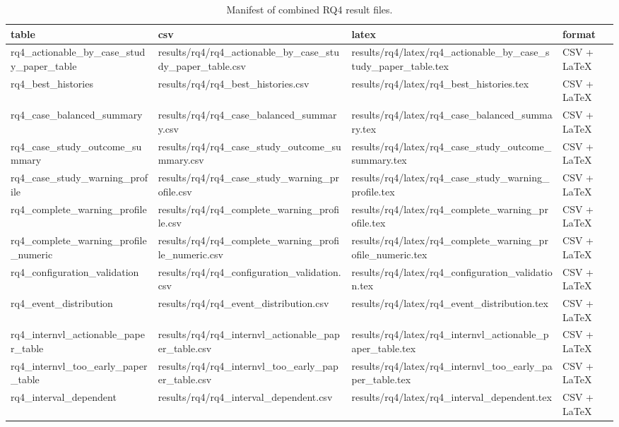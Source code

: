 \begin{table}[tbp]
\caption{Manifest of combined RQ4 result files.}
\label{tab:rq4-output-manifest}
\begin{tabular}{llll}
\toprule
table & csv & latex & format \\
\midrule
rq4\_actionable\_by\_case\_study\_paper\_table & results/rq4/rq4\_actionable\_by\_case\_study\_paper\_table.csv & results/rq4/latex/rq4\_actionable\_by\_case\_study\_paper\_table.tex & CSV + LaTeX \\
rq4\_best\_histories & results/rq4/rq4\_best\_histories.csv & results/rq4/latex/rq4\_best\_histories.tex & CSV + LaTeX \\
rq4\_case\_balanced\_summary & results/rq4/rq4\_case\_balanced\_summary.csv & results/rq4/latex/rq4\_case\_balanced\_summary.tex & CSV + LaTeX \\
rq4\_case\_study\_outcome\_summary & results/rq4/rq4\_case\_study\_outcome\_summary.csv & results/rq4/latex/rq4\_case\_study\_outcome\_summary.tex & CSV + LaTeX \\
rq4\_case\_study\_warning\_profile & results/rq4/rq4\_case\_study\_warning\_profile.csv & results/rq4/latex/rq4\_case\_study\_warning\_profile.tex & CSV + LaTeX \\
rq4\_complete\_warning\_profile & results/rq4/rq4\_complete\_warning\_profile.csv & results/rq4/latex/rq4\_complete\_warning\_profile.tex & CSV + LaTeX \\
rq4\_complete\_warning\_profile\_numeric & results/rq4/rq4\_complete\_warning\_profile\_numeric.csv & results/rq4/latex/rq4\_complete\_warning\_profile\_numeric.tex & CSV + LaTeX \\
rq4\_configuration\_validation & results/rq4/rq4\_configuration\_validation.csv & results/rq4/latex/rq4\_configuration\_validation.tex & CSV + LaTeX \\
rq4\_event\_distribution & results/rq4/rq4\_event\_distribution.csv & results/rq4/latex/rq4\_event\_distribution.tex & CSV + LaTeX \\
rq4\_internvl\_actionable\_paper\_table & results/rq4/rq4\_internvl\_actionable\_paper\_table.csv & results/rq4/latex/rq4\_internvl\_actionable\_paper\_table.tex & CSV + LaTeX \\
rq4\_internvl\_too\_early\_paper\_table & results/rq4/rq4\_internvl\_too\_early\_paper\_table.csv & results/rq4/latex/rq4\_internvl\_too\_early\_paper\_table.tex & CSV + LaTeX \\
rq4\_interval\_dependent & results/rq4/rq4\_interval\_dependent.csv & results/rq4/latex/rq4\_interval\_dependent.tex & CSV + LaTeX \\

\end{tabular}
\end{table}
